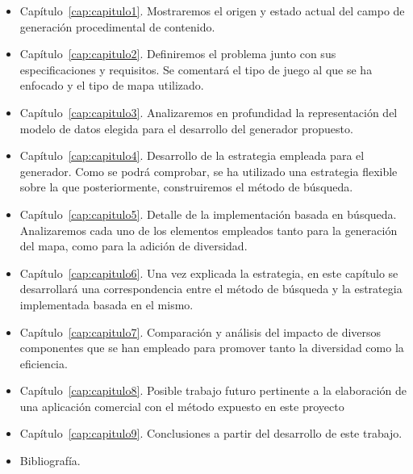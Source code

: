 \begin{itemize}
	\item Capítulo~\ref{cap:capitulo1}. Mostraremos el origen y estado actual del campo de generación procedimental de contenido.
	\item Capítulo~\ref{cap:capitulo2}. Definiremos el problema junto con sus especificaciones y requisitos. Se comentará el tipo de juego al que se ha enfocado y el tipo de mapa utilizado.
	\item Capítulo~\ref{cap:capitulo3}. Analizaremos en profundidad la representación del modelo de datos elegida para el desarrollo del generador propuesto.
	\item Capítulo~\ref{cap:capitulo4}. Desarrollo de la estrategia empleada para el generador. Como se podrá comprobar, se ha utilizado una estrategia flexible sobre la que posteriormente, construiremos el método de búsqueda.
	\item Capítulo~\ref{cap:capitulo5}. Detalle de la implementación basada en búsqueda. Analizaremos cada uno de los elementos empleados tanto para la generación del mapa, como para la adición de diversidad.
	\item Capítulo~\ref{cap:capitulo6}. Una vez explicada la estrategia, en este capítulo se desarrollará una correspondencia entre el método de búsqueda y la estrategia implementada basada en el mismo.
	\item Capítulo~\ref{cap:capitulo7}. Comparación y análisis del impacto de diversos componentes que se han empleado para promover tanto la diversidad como la eficiencia.
	\item Capítulo~\ref{cap:capitulo8}. Posible trabajo futuro pertinente a la elaboración de una aplicación comercial con el método expuesto en este proyecto
	\item Capítulo~\ref{cap:capitulo9}. Conclusiones a partir del desarrollo de este trabajo.
	\item Bibliografía.
\end{itemize}
